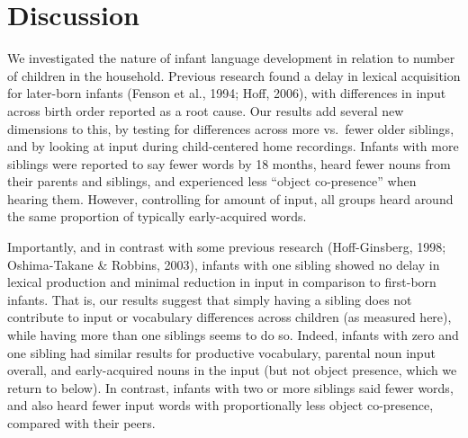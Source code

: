 \documentclass[
  english,
  man,floatsintext]{apa6}
\begin{document}
\hypertarget{discussion}{%
\section{Discussion}\label{discussion}}

We investigated the nature of infant language development in relation to number of children in the household. Previous research found a delay in lexical acquisition for later-born infants (Fenson et al., 1994; Hoff, 2006), with differences in input across birth order reported as a root cause. Our results add several new dimensions to this, by testing for differences across more vs.~fewer older siblings, and by looking at input during child-centered home recordings. Infants with more siblings were reported to say fewer words by 18 months, heard fewer nouns from their parents and siblings, and experienced less \enquote{object co-presence} when hearing them. However, controlling for amount of input, all groups heard around the same proportion of typically early-acquired words.

Importantly, and in contrast with some previous research (Hoff-Ginsberg, 1998; Oshima-Takane \& Robbins, 2003), infants with one sibling showed no delay in lexical production and minimal reduction in input in comparison to first-born infants. That is, our results suggest that simply having a sibling does not contribute to input or vocabulary differences across children (as measured here), while having more than one siblings seems to do so. Indeed, infants with zero and one sibling had similar results for productive vocabulary, parental noun input overall, and early-acquired nouns in the input (but not object presence, which we return to below). In contrast, infants with two or more siblings said fewer words, and also heard fewer input words with proportionally less object co-presence, compared with their peers.
\end{document}
